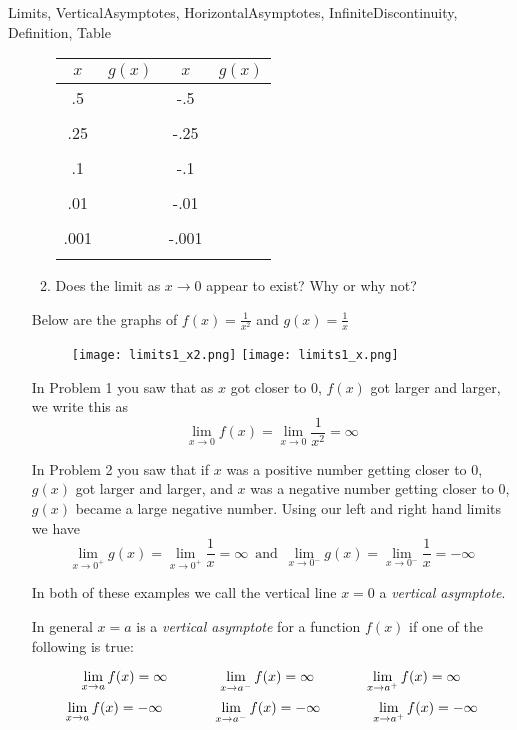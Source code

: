 \begin{tagblock}{Limits, VerticalAsymptotes, HorizontalAsymptotes, InfiniteDiscontinuity, Definition, Table}
\begin{question}
\begin{enumerate}
\begin{enumerate}
\begin{tabular}{c | c c | c  }
$x$ & $g(x)$  \hspace{2in} & $x$ & $g(x)$ \\ \hline
.5 & \hspace{.5in} & -.5 &  \\ &&& \\
.25 & & -.25  & \\ &&&\\
.1 & & -.1& \\&&& \\
.01 && -.01 &\\ &&&\\
.001 && -.001 &\\ &&&\\
\end{tabular}
\item Does the limit as $x \to 0$ appear to exist?  Why or why not?
\end{enumerate}


\newpage
 Below are the graphs of $\displaystyle f(x) = \frac{1}{x^2}$ and $\displaystyle g(x) = \frac{1}{x}$

\begin{figure}[h]
\texttt{[image: limits1\_x2.png]} \hfill \texttt{[image: limits1\_x.png]}
\end{figure}
In Problem 1 you saw that as $x$ got closer to $0$, $f(x)$ got larger and larger, we write this as 
\[ \lim_{x \to 0} f(x) = \lim_{x \to 0} \frac{1}{x^2} = \infty \]

In Problem 2 you saw that if $x$ was a positive number getting closer to $0$, $g(x)$ got larger and larger, and $x$ was a negative number getting closer to $0$, $g(x)$ became a large negative number.  Using our left and right hand limits we have
\[\lim_{x \to 0^+} g(x) = \lim_{x \to 0^+} \frac{1}{x} = \infty \, \text{ and } \, \lim_{x \to 0^-} g(x) = \lim_{x \to 0^-} \frac{1}{x} = -\infty\]

In both of these examples we call the vertical line $x=0$ a \emph{vertical asymptote}.

In general $x=a$ is a \emph{vertical asymptote} for a function $f(x)$ if one of the following is true:

\[\lim_{x \to a} f(x) = \infty \hspace{.5in} \lim_{x \to a^-} f(x)  = \infty \hspace{.5in}  \lim_{x \to a^+} f(x)  = \infty\]
\[\lim_{x \to a} f(x) = -\infty \hspace{.5in} \lim_{x \to a^-} f(x)  = -\infty \hspace{.5in}  \lim_{x \to a^+} f(x)  = -\infty\]


\end{enumerate}
\end{question}
\end{tagblock}
